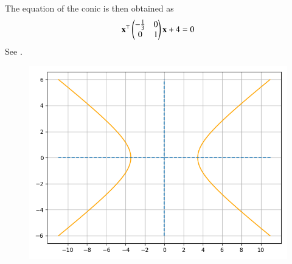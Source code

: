 The equation of the conic is then obtained as
\begin{align}
\boldsymbol{\mathbf{x}}^\top\begin{pmatrix}-\frac{1}{3}&0\\0&1\end{pmatrix}\boldsymbol{\mathbf{x}} +4 = 0
\end{align}
See .
\begin{figure}[ht]
\centering
\includegraphics[width = \columnwidth]{chapters/11/11/4/13/figs/fig1.png}
\caption{}
\label{fig:chapters/11/11/4/13/1}
\end{figure}
\begin{table}[h]
\centering

\caption{}
\label{tab:chapters/11/11/4/13/1}
\end{table}
